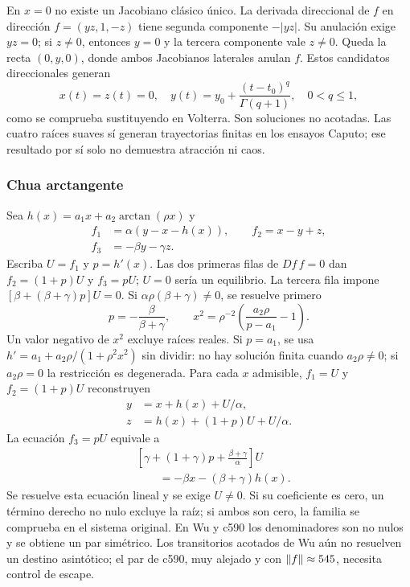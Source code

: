 En $x=0$ no existe un Jacobiano clásico único. La derivada direccional
de $f$ en dirección $f=(yz,1,-z)$ tiene segunda componente $-|yz|$.
Su anulación exige $yz=0$; si $z\ne0$, entonces $y=0$ y la tercera
componente vale $z\ne0$. Queda la recta $(0,y,0)$, donde ambos
Jacobianos laterales anulan $f$. Estos candidatos direccionales generan
\begin{equation}
 x(t)=z(t)=0,\quad
 y(t)=y_0+\frac{(t-t_0)^q}{\Gamma(q+1)},\quad 0<q\le1,
 \label{bre:geo:munoz-boundary}
\end{equation}
como se comprueba sustituyendo en Volterra. Son soluciones no acotadas.
Las cuatro raíces suaves sí generan trayectorias finitas en los ensayos
Caputo; ese resultado por sí solo no demuestra atracción ni caos.

\subsubsection{Chua arctangente}
Sea $h(x)=a_1x+a_2\arctan(\rho x)$ y
\begin{equation}
 \begin{aligned}
 f_1&=\alpha(y-x-h(x)),\qquad f_2=x-y+z,\\
 f_3&=-\beta y-\gamma z.
 \end{aligned}
 \label{bre:geo:chua}
\end{equation}
Escriba $U=f_1$ y $p=h'(x)$. Las dos primeras filas de $Df\,f=0$
dan $f_2=(1+p)U$ y $f_3=pU$; $U=0$ sería un equilibrio. La tercera
fila impone $[\beta+(\beta+\gamma)p]U=0$. Si
$\alpha\rho(\beta+\gamma)\ne0$, se resuelve primero
\begin{equation}
 p=-\frac\beta{\beta+\gamma},\qquad
 x^2=\rho^{-2}\left(\frac{a_2\rho}{p-a_1}-1\right).
 \label{bre:geo:arctan-x}
\end{equation}
Un valor negativo de $x^2$ excluye raíces reales. Si $p=a_1$, se usa
$h'=a_1+a_2\rho/(1+\rho^2x^2)$ sin dividir: no hay solución finita
cuando $a_2\rho\ne0$; si $a_2\rho=0$ la restricción es degenerada.
Para cada $x$ admisible, $f_1=U$ y $f_2=(1+p)U$ reconstruyen
\begin{equation}
 \begin{aligned}
 y&=x+h(x)+U/\alpha,\\
 z&=h(x)+(1+p)U+U/\alpha.
 \end{aligned}
 \label{bre:geo:arctan-yz}
\end{equation}
La ecuación $f_3=pU$ equivale a
\begin{equation}
 \begin{aligned}
 &\left[\gamma+(1+\gamma)p+\frac{\beta+\gamma}{\alpha}\right]U\\
 &\hspace{2em}=-\beta x-(\beta+\gamma)h(x).
 \end{aligned}
 \label{bre:geo:arctan-U}
\end{equation}
Se resuelve esta ecuación lineal y se exige $U\ne0$. Si su coeficiente
es cero, un término derecho no nulo excluye la raíz; si ambos son cero,
la familia se comprueba en el sistema original. En Wu y c590 los
denominadores son no nulos y se obtiene un par simétrico. Los transitorios
acotados de Wu aún no resuelven un destino asintótico; el par de c590,
muy alejado y con $\left\lVert f\right\rVert\approx545$, necesita control de escape.

